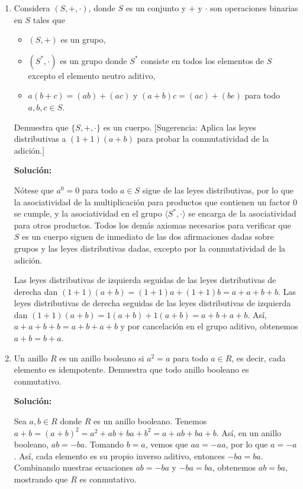 \begin{enumerate}
	\item
	
	Considera $(S, +, \cdot)$, donde $S$ es un conjunto y $+$ y $\cdot$ son operaciones binarias en $S$ tales que
	\begin{itemize}
		\item $(S, +)$ es un grupo,
		\item $(S^*, \cdot)$ es un grupo donde $S^*$ consiste en todos los elementos de $S$ excepto el elemento neutro aditivo,
		\item $a(b + c) = (ab) + (ac)$ y $(a + b)c = (ac) + (be)$ para todo $a, b, c \in S$.
	\end{itemize}
	Demuestra que $\{S, +, \cdot\}$ es un cuerpo. [Sugerencia: Aplica las leyes distributivas a $(1 + 1)(a + b)$ para probar la conmutatividad de la adición.]
	
	\textbf{Solución:}
	
	Nótese que $a^0 = 0$ para todo $a \in S$ sigue de las leyes distributivas, por lo que la asociatividad de la multiplicación para productos que contienen un factor $0$ se cumple, y la asociatividad en el grupo $\langle S^*, \cdot \rangle$ se encarga de la asociatividad para otros productos. Todos los demás axiomas necesarios para verificar que $S$ es un cuerpo siguen de inmediato de las dos afirmaciones dadas sobre grupos y las leyes distributivas dadas, excepto por la conmutatividad de la adición.
	
	Las leyes distributivas de izquierda seguidas de las leyes distributivas de derecha dan $(1 + 1)(a + b) = (1 + 1)a + (1 + 1)b = a + a + b + b$. Las leyes distributivas de derecha seguidas de las leyes distributivas de izquierda dan $(1 + 1)(a + b) = 1(a + b) + 1(a + b) = a + b + a + b$. Así, $a + a + b + b = a + b + a + b$ y por cancelación en el grupo aditivo, obtenemos $a + b = b + a$.
	
	\item
	
	Un anillo $R$ es un anillo booleano si $a^2 = a$ para todo $a \in R$, es decir, cada elemento es idempotente. Demuestra que todo anillo booleano es conmutativo.
	
	\textbf{Solución:}
	
	Sea $a, b \in R$ donde $R$ es un anillo booleano. Tenemos $a + b = (a + b)^2 = a^2 + ab + ba + b^2 = a + ab + ba + b$. Así, en un anillo booleano, $ab = -ba$. Tomando $b = a$, vemos que $aa = -aa$, por lo que $a = -a$. Así, cada elemento es su propio inverso aditivo, entonces $-ba = ba$. Combinando nuestras ecuaciones $ab = -ba$ y $-ba = ba$, obtenemos $ab = ba$, mostrando que $R$ es conmutativo.
	

\end{enumerate}
